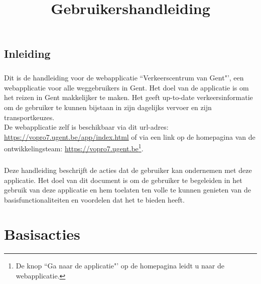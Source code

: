 \documentclass[11pt,twoside,a4paper]{report}
\title{Gebruikershandleiding}
\begin{document}




	\tableofcontents
	
	\newpage
	
	\section*{Inleiding}
	\paragraph{}Dit is de handleiding voor de webapplicatie ``Verkeerscentrum van Gent"', een webapplicatie voor alle weggebruikers in Gent. Het doel van de applicatie is om het reizen in Gent makkelijker te maken. %
	Het geeft up-to-date verkeersinformatie om de gebruiker te kunnen bijstaan in zijn dagelijks vervoer en zijn transportkeuzes. \\De webapplicatie zelf is beschikbaar via dit url-adres: \url{https://vopro7.ugent.be/app/index.html} of via een link op de homepagina van de ontwikkelingsteam: \url{https://vopro7.ugent.be}\footnote{De knop ``Ga naar de applicatie"' op de homepagina leidt u naar de webapplicatie.}.
	\paragraph{}Deze handleiding beschrijft de acties dat de gebruiker kan ondernemen met deze applicatie. Het doel van dit document is om de gebruiker te begeleiden in het gebruik van deze applicatie en hem toelaten ten volle te kunnen genieten van de basisfunctionaliteiten en voordelen dat het te bieden heeft.



	

\chapter{Basisacties}
\end{document}
